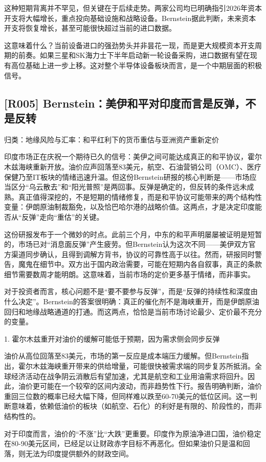 \documentclass[11pt]{ctexart}
\begin{document}
这种短期背离并不罕见，但关键在于后续走势。两家公司均已明确指引2026年资本开支将大幅增长，重点投向基础设施和战略设备。Bernstein据此判断，未来资本开支将恢复增长，甚至可能很快超过当前的进口数据。

这意味着什么？当前设备进口的强劲势头并非昙花一现，而是更大规模资本开支周期的前奏。如果三星和SK海力士下半年启动新一轮设备采购，进口数据有望在现有高位基础上进一步上移。这对整个半导体设备板块而言，是一个中期层面的积极信号。

\subsection{[R005] Bernstein：美伊和平对印度而言是反弹，不是反转}
{\small\color{refgray}归类：地缘风险与汇率：和平红利下的货币重估与亚洲资产重新定价}

印度市场正在庆祝一个期待已久的信号：美伊之间可能达成真正的和平协议，霍尔木兹海峡重新开放。油价应声回落至83美元，航空、石油营销公司（OMC）、医疗保健乃至IT板块的情绪迅速升温。但这份Bernstein研报的核心判断是——市场应当区分“乌云散去”和“阳光普照”是两回事。反弹是确定的，但反转的条件远未成熟。真正值得深挖的，不是短期的情绪修复，而是和平协议可能带来的两个结构性变量：伊朗原油制裁豁免，以及恰巴哈尔港的战略价值。这两点，才是决定印度能否从“反弹”走向“重估”的关键。

这份研报发布于一个微妙的时点。此前三个月，中东的和平声明屡屡被证明是短暂的，市场已对“消息面反弹”产生疲劳。但Bernstein认为这次不同——美伊双方官方渠道同步确认，且得到调解方背书，协议的可靠性高于以往。然而，研报同时警告，魔鬼在细节中。双方出于国内政治需要，可能在短期内各自叙事，真正的条款细节需要数周才能明朗。这意味着，当前市场的定价更多基于情绪，而非事实。

对于投资者而言，核心问题不是“要不要参与反弹”，而是“反弹的持续性和深度由什么决定”。Bernstein的答案很明确：真正的催化剂不是海峡重开，而是伊朗原油回归和地缘战略通道的打通。而这两点，恰恰是当前市场讨论最少、定价最不充分的变量。

1. 霍尔木兹重开对油价的缓解可能低于预期，因为需求侧会同步反弹

油价从高位回落至83美元，市场的第一反应是成本端压力缓解。但Bernstein指出，霍尔木兹海峡重开带来的供给增量，可能很快被需求端的同步复苏所抵消。全球经济活动在战争阴云消散后有望加速，尤其是航空和工业用油需求将回升。因此，油价更可能在一个较窄的区间内波动，而非趋势性下行。报告明确判断，油价重回三位数的概率已经大幅下降，但同样难以跌至60-70美元的低位区间。这一判断意味着，依赖低油价的板块（如航空、石化）的利好是有限的、阶段性的，而非结构性的。

对于印度而言，油价的“不涨”比“大跌”更重要。印度作为原油净进口国，油价稳定在80-90美元区间，已经足以让财政赤字目标不再恶化。但如果油价只是温和回落，则无法为印度提供额外的财政空间。
\end{document}
